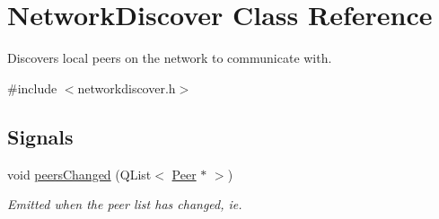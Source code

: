 \hypertarget{class_network_discover}{
\section{\-Network\-Discover \-Class \-Reference}
\label{class_network_discover}
}


\-Discovers local peers on the network to communicate with.  




{\ttfamily \#include $<$networkdiscover.\-h$>$}

\subsection*{\-Signals}
\begin{DoxyCompactItemize}
\item 
void \hyperlink{class_network_discover_a42566247e43198ea9cce91eb5f15511d}{peers\-Changed} (\-Q\-List$<$ \hyperlink{class_peer}{\-Peer} $\ast$ $>$)
\begin{DoxyCompactList}\small\item\em \-Emitted when the peer list has changed, ie. \end{DoxyCompactList}\end{DoxyCompactItemize}
